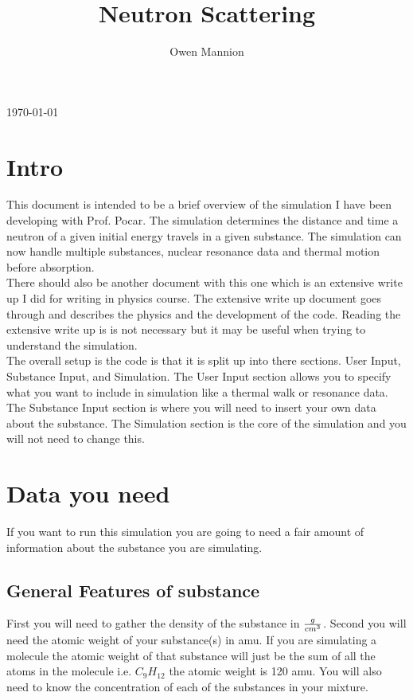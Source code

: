 \documentclass[12pt]{amsart}
\begin{document}
\title{Neutron Scattering}
\author{Owen Mannion}
\today
\maketitle

\section{Intro}
\indent This document is intended to be a brief overview of the simulation I have been developing with Prof. Pocar. The simulation determines the distance and time a neutron of a given initial energy travels in a given substance. The simulation can now handle multiple substances, nuclear resonance data and thermal motion before absorption.\\
\indent There should also be another document with this one which is an extensive write up I did for writing in physics course. The extensive write up document goes through and describes the physics and the development of the code. Reading the extensive write up is is not necessary but it may be useful when trying to understand the simulation.\\
\indent The overall setup is the code is that it is split up into there sections. User Input, Substance Input, and Simulation. The User Input section allows you to specify what you want to include in simulation  like a thermal walk or resonance data. The Substance Input section is where you will need to insert your own data about the substance. The Simulation section is the core of the simulation and you will not need to change this.
\section{Data you need}
If you want to run this simulation you are going to need a fair amount of information about the substance you are simulating.\\
\subsection{ General Features of substance}
\indent First you will need to gather the density of the substance in $g\over{cm^{3}}$. Second you will need the atomic weight of your substance(s) in amu. If you are simulating a molecule the atomic weight of that substance will just be the sum of all the atoms in the molecule i.e. $C_{9}H_{12}$ the atomic weight is 120 amu. You will also need to know the concentration of each of the substances in your mixture.\\
\end{document}
